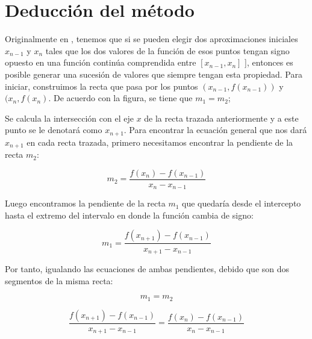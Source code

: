 \section{Deducción del método}

Originalmente en \cite{AN_Spanish}, tenemos que si se pueden elegir dos aproximaciones iniciales $ x_{n-1} $ y $ x_n $ tales que los dos valores de la función de esos puntos tengan signo opuesto en una función continúa comprendida entre $ [x_{n-1}, x_n] $ ], entonces es posible generar una sucesión de valores que siempre tengan esta propiedad.\newline\newline
Para iniciar, construimos la recta que pasa por los puntos $ (x_{n-1}, f(x_{n-1})) $ y $ (x_n, f(x_n) $. De acuerdo con la figura, se tiene que $ m_1 = m_2 $;\newline\newline


Se calcula la intersección con el eje $ x $ de la recta trazada anteriormente y a este punto se le denotará como $ x_{n+1} $.\newline\newline
Para encontrar la ecuación general que nos dará $ x_{n+1} $ en cada recta trazada, primero necesitamos encontrar la pendiente de la recta $ m_2 $:

\begin{displaymath}
    m_2 = \frac{f(x_n) - f(x_{n-1})}{x_n - x_{n-1}}
\end{displaymath}

Luego encontramos la pendiente de la recta $ m_1 $ que quedaría desde el intercepto hasta el extremo del intervalo en donde la función cambia de signo:

\begin{displaymath}
    m_1 = \frac{f(x_{n+1}) - f(x_{n-1})}{x_{n+1} - x_{n-1}}
\end{displaymath}

Por tanto, igualando las ecuaciones de ambas pendientes, debido que son dos segmentos de la misma recta:

\begin{displaymath}
    m_1 = m_2
\end{displaymath}

\begin{displaymath}
    \frac{f(x_{n+1}) - f(x_{n-1})}{x_{n+1} - x_{n-1}} = \frac{f(x_n) - f(x_{n-1})}{x_n - x_{n-1}}
\end{displaymath}

